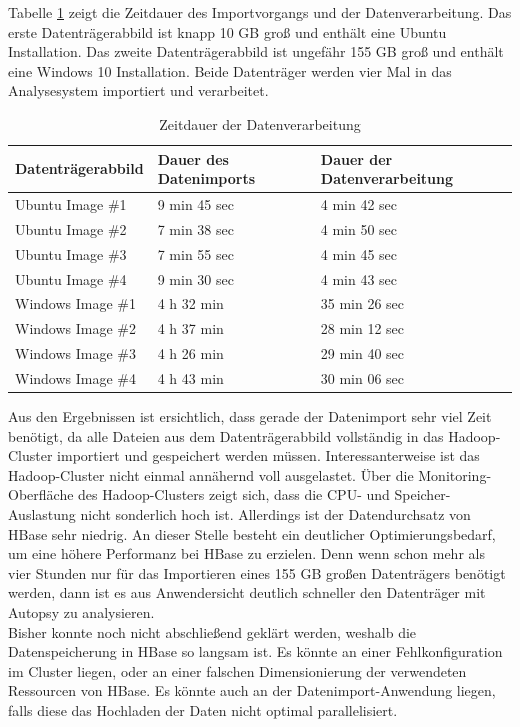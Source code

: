 \noindent
Tabelle \ref{tab:performance_results} zeigt die Zeitdauer des Importvorgangs und der Datenverarbeitung. Das erste Datenträgerabbild ist knapp 10 GB groß und enthält eine Ubuntu Installation. Das zweite Datenträgerabbild ist ungefähr 155 GB groß und enthält eine Windows 10 Installation. Beide Datenträger werden vier Mal in das Analysesystem importiert und verarbeitet.\\


\begin{table}[ht]
\centering
\begin{tabular}{l|l|l}
Datenträgerabbild & Dauer des Datenimports & Dauer der Datenverarbeitung	\\ \hline
Ubuntu Image \#1 		& 9 min 45 sec	& 4 min 42 sec  \\
Ubuntu Image \#2 		& 7 min 38 sec	& 4 min 50 sec  \\
Ubuntu Image \#3 		& 7 min 55 sec	& 4 min 45 sec  \\
Ubuntu Image \#4 		& 9 min 30 sec	& 4 min 43 sec	\\ \hline
Windows Image \#1 		& 4 h 32 min		& 35 min 26 sec	\\
Windows Image \#2 		& 4 h 37 min		& 28 min 12 sec	\\
Windows Image \#3 		& 4 h 26 min		& 29 min 40 sec	\\
Windows Image \#4 		& 4 h 43 min		& 30 min 06 sec	\\
\end{tabular}
\caption{Zeitdauer der Datenverarbeitung}
\label{tab:performance_results}
\end{table}

\noindent
Aus den Ergebnissen ist ersichtlich, dass gerade der Datenimport sehr viel Zeit benötigt, da alle Dateien aus dem Datenträgerabbild vollständig in das Hadoop-Cluster importiert und gespeichert werden müssen. Interessanterweise ist das Hadoop-Cluster nicht einmal annähernd voll ausgelastet. Über die Monitoring-Oberfläche des Hadoop-Clusters zeigt sich, dass die CPU- und Speicher-Auslastung nicht sonderlich hoch ist. Allerdings ist der Datendurchsatz von HBase sehr niedrig. An dieser Stelle besteht ein deutlicher Optimierungsbedarf, um eine höhere Performanz bei HBase zu erzielen. Denn wenn schon mehr als vier Stunden nur für das Importieren eines 155 GB großen Datenträgers benötigt werden, dann ist es aus Anwendersicht deutlich schneller den Datenträger mit Autopsy zu analysieren.\\
Bisher konnte noch nicht abschließend geklärt werden, weshalb die Datenspeicherung in HBase so langsam ist. Es könnte an einer Fehlkonfiguration im Cluster liegen, oder an einer falschen Dimensionierung der verwendeten Ressourcen von HBase. Es könnte auch an der Datenimport-Anwendung liegen, falls diese das Hochladen der Daten nicht optimal parallelisiert.\\

